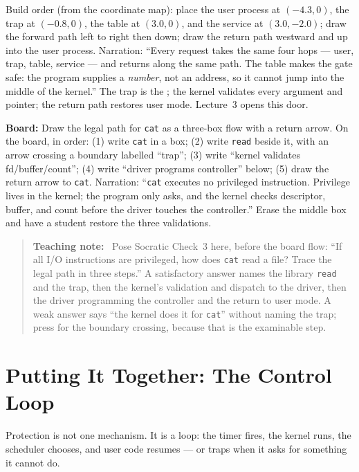 \documentclass[11pt]{article}
\newenvironment{teachingaside}{\begin{quote}\small\color{primary-gold}\textbf{Teaching note:}\ }{\end{quote}}
\begin{document}
Build order (from the coordinate map): place the user process at $(-4.3,0)$, the trap at $(-0.8,0)$, the table at $(3.0,0)$, and the service at $(3.0,-2.0)$; draw the forward path left to right then down; draw the return path westward and up into the user process. Narration: ``Every request takes the same four hops --- user, trap, table, service --- and returns along the same path. The table makes the gate safe: the program supplies a \emph{number}, not an address, so it cannot jump into the middle of the kernel.'' The trap is the ; the kernel validates every argument and pointer; the return path restores user mode. Lecture~3 opens this door.

\noindent\textbf{Board:} Draw the legal path for \texttt{cat} as a three-box flow with a return arrow. On the board, in order: (1) write \texttt{cat} in a box; (2) write \texttt{read} beside it, with an arrow crossing a boundary labelled ``trap''; (3) write ``kernel validates fd/buffer/count''; (4) write ``driver programs controller'' below; (5) draw the return arrow to \texttt{cat}. Narration: ``\texttt{cat} executes no privileged instruction. Privilege lives in the kernel; the program only asks, and the kernel checks descriptor, buffer, and count before the driver touches the controller.'' Erase the middle box and have a student restore the three validations.

\begin{teachingaside}
Pose Socratic Check~3 here, before the board flow: ``If all I/O instructions are privileged, how does \texttt{cat} read a file? Trace the legal path in three steps.'' A satisfactory answer names the library \texttt{read} and the trap, then the kernel's validation and dispatch to the driver, then the driver programming the controller and the return to user mode. A weak answer says ``the kernel does it for \texttt{cat}'' without naming the trap; press for the boundary crossing, because that is the examinable step.
\end{teachingaside}

\section{Putting It Together: The Control Loop}

Protection is not one mechanism. It is a loop: the timer fires, the kernel runs, the scheduler chooses, and user code resumes --- or traps when it asks for something it cannot do.
\end{document}
